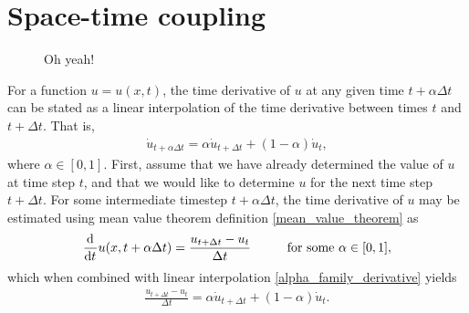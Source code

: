 
\chapter{Space-time coupling} \label{ssn_time_dependent_problems}

\begin{figure}
  \centering
    \def\svgwidth{\linewidth}
    
  \caption[$\alpha$-family of time derivative approximation]{Oh yeah!}
  \label{alpha_family_image}
\end{figure}

For a function $u = u(x,t)$, the time derivative of $u$ at any given time $t+\alpha \Delta t$ can be stated as a linear interpolation of the time derivative between times $t$ and $t + \Delta t$.  That is,
\begin{align}
  \label{alpha_family_derivative}
  \dot{u}_{t + \alpha \Delta t} = \alpha \dot{u}_{t + \Delta t} + (1-\alpha) \dot{u}_t,
\end{align}
where $\alpha \in [0,1]$.  First, assume that we have already determined the value of $u$ at time step $t$, and that we would like to determine $u$ for the next time step $t + \Delta t$.  For some intermediate timestep $t + \alpha \Delta t$, the time derivative of $u$ may be estimated using mean value theorem definition \cref{mean_value_theorem}  as
\begin{align*}
  \totder{}{t} u(x,t + \alpha \Delta t) = \frac{u_{t + \Delta t} - u_t}{\Delta t} \hspace{10mm} \text{for some $\alpha \in [0,1]$},
\end{align*}
which when combined with linear interpolation \cref{alpha_family_derivative} yields 
\begin{align}
  \label{generalized_time_derivative}
  \frac{u_{t + \Delta t} - u_t}{\Delta t} = \alpha \dot{u}_{t + \Delta t} + (1-\alpha) \dot{u}_t.
\end{align}

